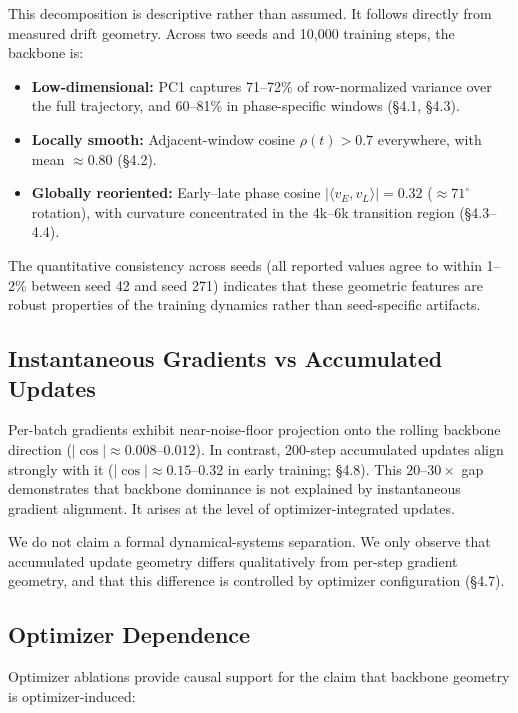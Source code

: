 \documentclass[11pt,a4paper]{article}
\begin{document}
This decomposition is descriptive rather than assumed. It follows directly from measured drift geometry. Across two seeds and 10{,}000 training steps, the backbone is:

\begin{itemize}
\item \textbf{Low-dimensional:} PC1 captures 71--72\% of row-normalized variance over the full trajectory, and 60--81\% in phase-specific windows (\S4.1, \S4.3).
\item \textbf{Locally smooth:} Adjacent-window cosine $\rho(t) > 0.7$ everywhere, with mean $\approx 0.80$ (\S4.2).
\item \textbf{Globally reoriented:} Early--late phase cosine $|\langle v_E, v_L \rangle| = 0.32$ ($\approx 71^{\circ}$ rotation), with curvature concentrated in the 4k--6k transition region (\S4.3--4.4).
\end{itemize}

The quantitative consistency across seeds (all reported values agree to within 1--2\% between seed 42 and seed 271) indicates that these geometric features are robust properties of the training dynamics rather than seed-specific artifacts.


\subsection{Instantaneous Gradients vs Accumulated Updates}

Per-batch gradients exhibit near-noise-floor projection onto the rolling backbone direction ($|\cos| \approx 0.008$--$0.012$). In contrast, 200-step accumulated updates align strongly with it ($|\cos| \approx 0.15$--$0.32$ in early training; \S4.8). This $20$--$30\times$ gap demonstrates that backbone dominance is not explained by instantaneous gradient alignment. It arises at the level of optimizer-integrated updates.

We do not claim a formal dynamical-systems separation. We only observe that accumulated update geometry differs qualitatively from per-step gradient geometry, and that this difference is controlled by optimizer configuration (\S4.7).


\subsection{Optimizer Dependence}

Optimizer ablations provide causal support for the claim that backbone geometry is optimizer-induced:
\end{document}
